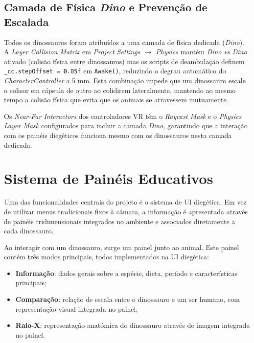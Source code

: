 \documentclass[a4paper,11pt]{report}
\newcommand{\code}[1]{\texttt{#1}}
\begin{document}
\subsection{Camada de Física \textit{Dino} e Prevenção de Escalada}

Todos os dinossauros foram atribuídos a uma camada de física dedicada
(\textit{Dino}). A \textit{Layer Collision Matrix} em
\textit{Project Settings $\to$ Physics} mantém \textit{Dino vs Dino}
ativado (colisão física entre dinossauros) mas os scripts de deambulação
definem \code{\_cc.stepOffset = 0.05f} em \code{Awake()}, reduzindo o
degrau automático do \textit{CharacterController} a 5 mm. Esta combinação
impede que um dinossauro escale o colisor em cápsula de outro ao colidirem
lateralmente, mantendo ao mesmo tempo a colisão física que evita que os
animais se atravessem mutuamente.

Os \textit{Near-Far Interactors} dos controladores VR têm o \textit{Raycast
Mask} e o \textit{Physics Layer Mask} configurados para incluir a camada
\textit{Dino}, garantindo que a interação com os painéis diegéticos funciona
mesmo com os dinossauros nesta camada dedicada.

\section{Sistema de Painéis Educativos}
\label{sec:panels}

Uma das funcionalidades centrais do projeto é o sistema de UI diegética.
Em vez de utilizar menus tradicionais fixos à câmara, a informação é
apresentada através de painéis tridimensionais integrados no ambiente e
associados diretamente a cada dinossauro.

Ao interagir com um dinossauro, surge um painel junto ao animal. Este painel
contém três modos principais, todos implementados na UI diegética:

\begin{itemize}
    \setlength\itemsep{0pt}
    \item \textbf{Informação}: dados gerais sobre a espécie, dieta, período
          e características principais;
    \item \textbf{Comparação}: relação de escala entre o dinossauro e um
          ser humano, com representação visual integrada no painel;
    \item \textbf{Raio-X}: representação anatómica do dinossauro através de
          imagem integrada no painel.
\end{itemize}
\end{document}
